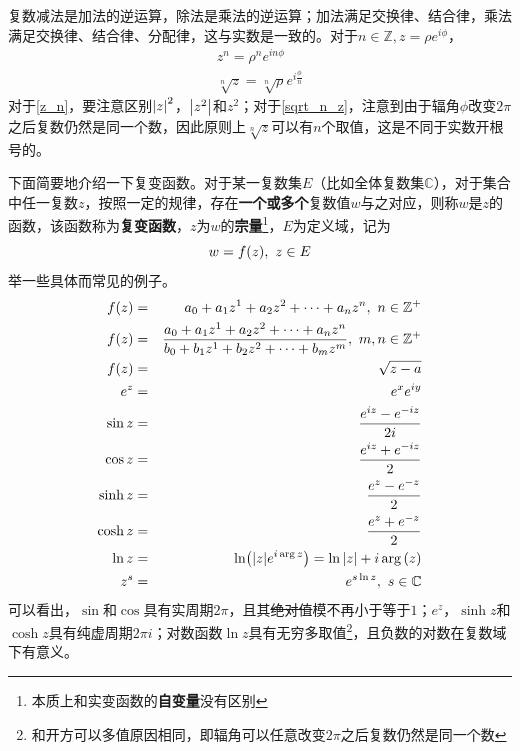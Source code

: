 \documentclass[12pt,a4paper,openany,twoside]{book}
\numberwithin{equation}{section}
\begin{document}
          复数减法是加法的逆运算，除法是乘法的逆运算；加法满足交换律、结合律，乘法满足交换律、结合律、分配律，这与实数是一致的。对于$n\in\mathbb{Z},z=\rho e^{i\phi}$，
          \begin{eqnarray}
            \label{z_n}
            z^n=\rho^ne^{in\phi}\\
            \label{sqrt_n_z}
            \sqrt[n]{z}=\sqrt[n]{\rho}e^{i\frac{\phi}{n}}
          \end{eqnarray}
          对于\ref{z_n}，要注意区别$\abs{z}^2$，$\abs{z^2}$和$z^2$；对于\ref{sqrt_n_z}，注意到由于辐角$\phi$改变$2\pi$之后复数仍然是同一个数，因此原则上$\sqrt[n]{z}$可以有$n$个取值，这是不同于实数开根号的。

          下面简要地介绍一下复变函数。对于某一复数集$E$（比如全体复数集$\mathbb{C}$），对于集合中任一复数$z$，按照一定的规律，存在\textbf{一个或多个}复数值$w$与之对应，则称$w$是$z$的函数，该函数称为\textbf{复变函数}，$z$为$w$的\textbf{宗量}\footnote{本质上和实变函数的\textbf{自变量}没有区别}，$E$为定义域，记为
          \begin{equation}
            w=f\qty(z),\ z\in E
          \end{equation}
          举一些具体而常见的例子。
          \begin{eqnarray*}
            f\qty(z)&=&a_0+a_1z^1+a_2z^2+\cdots+a_nz^n,\ n\in\mathbb{Z}^+\\
            f\qty(z)&=&\frac{a_0+a_1z^1+a_2z^2+\cdots+a_nz^n}{b_0+b_1z^1+b_2z^2+\cdots+b_mz^m},\ m,n\in\mathbb{Z}^+\\
            f\qty(z)&=&\sqrt{z-a}\\
            e^z&=&e^xe^{iy}\\
            \sin z&=&\frac{e^{iz}-e^{-iz}}{2i}\\
            \cos z&=&\frac{e^{iz}+e^{-iz}}{2}\\
            \sinh z&=&\frac{e^z-e^{-z}}{2}\\
            \cosh z&=&\frac{e^z+e^{-z}}{2}\\
            \ln z&=&\ln(\abs{z}e^{i\arg{z}})=\ln\abs{z}+i\arg\qty(z)\\
            z^s&=&e^{s\ln z},\ s\in\mathbb{C}
          \end{eqnarray*}
          可以看出，$\sin$和$\cos$具有实周期$2\pi$，且其\sout{绝对值}模不再小于等于$1$；$e^z$，$\sinh z$和$\cosh z$具有纯虚周期$2\pi i$；对数函数$\ln z$具有无穷多取值\footnote{和开方可以多值原因相同，即辐角可以任意改变$2\pi$之后复数仍然是同一个数}，且负数的对数在复数域下有意义。
\end{document}
